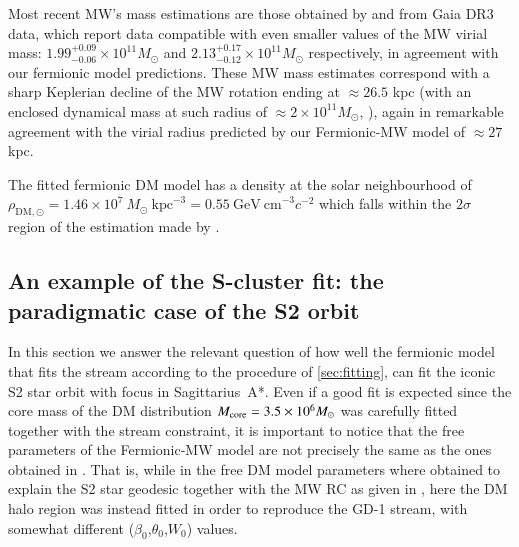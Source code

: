 \documentclass[twocolumn]{aa}
\begin{document}
Most recent MW's mass estimations are those obtained by
\citet{Jiao2023} and \citet{Ou2023} from Gaia DR3 data, which report data compatible with even smaller values of the MW virial mass: $1.99^{+0.09}_{-0.06}\times10^{11} M_\odot$ and $2.13^{+0.17}_{-0.12}\times10^{11} M_\odot$ respectively, in agreement with our fermionic model predictions. These MW mass estimates correspond with a sharp Keplerian decline of the MW rotation ending at $\approx 26.5$ kpc (with an enclosed dynamical mass at such radius of $\approx 2\times 10^{11} M_\odot$, \citealp{Jiao2023}), again in remarkable agreement with the virial radius predicted by our Fermionic-MW model of $\approx 27$ kpc. 

The fitted fermionic DM model has a density at the solar neighbourhood of
$\rho_{\mathrm{DM},\odot}=1.46\times10^7~M_\odot~\mathrm{kpc}^{-3}=0.55~\mathrm{GeV~cm}^{-3} c^{-2}$ which falls within the $2\sigma$ region of the estimation made by \citet{Salucci2010}.

\subsection{An example of the S-cluster fit: the paradigmatic case of the S2 orbit}
In this section we answer the relevant question of how well the fermionic model that fits the stream according to the procedure of \cref{sec:fitting}, can fit the iconic S2 star orbit with focus in Sagittarius~A*. Even if a good fit is expected since the core mass of the DM distribution $M_{\rm{core}}=3.5\times 10^6 M_\odot$ was carefully fitted together with the stream constraint, it is important to notice that the free parameters of the Fermionic-MW model are not precisely the same as the ones obtained in \cite{2020A&A...641A..34B}. That is, while in \cite{2020A&A...641A..34B} the free DM model parameters where obtained to explain the S2 star geodesic together with the MW RC as given in \cite{sofue_rotation_2013}, here the DM halo region was instead fitted in order to reproduce the GD-1 stream, with somewhat different ($\beta_0$,$\theta_0$,$W_0$) values. 
\end{document}
